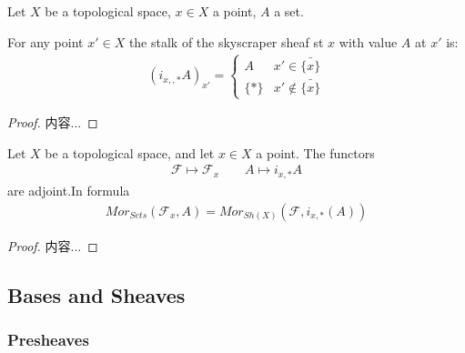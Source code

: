 \documentclass[Total.tex]{subfiles}
\begin{document}
				\begin{lemma}
					Let $X$ be a topological space, $x\in X$ a point, $A$ a set.
					
					For any point $x'\in X$ the stalk of the skyscraper sheaf st $x$ with value $A$ at $x'$ is:
					\begin{gather*}
						(i_{x,,*}A)_{x'}=\begin{cases}
							A&x'\in \bar{\{x\}}\\
							\{*\}&x'\notin \bar{\{x\}}
						\end{cases}
					\end{gather*}
				\end{lemma}
				\begin{proof}
					内容...
				\end{proof}
				\begin{lemma}
					Let $X$ be a topological space, and let $x\in X$ a point. The functors
					\begin{gather*}
						\mathcal{F}\mapsto\mathcal{F}_x\qquad A\mapsto i_{x,*}A
					\end{gather*}
					are adjoint.In formula
					\begin{gather*}
						Mor_{Sets}(\mathcal{F}_x,A)=Mor_{Sh(X)}(\mathcal{F},i_{x,*}(A))
					\end{gather*}
				\end{lemma}
				\begin{proof}
					内容...
				\end{proof}
			\subsection{Bases and Sheaves}
			
				\subsubsection{Presheaves}
			
\end{document}
